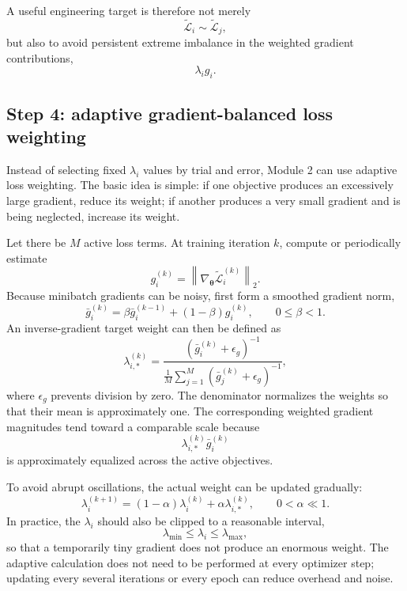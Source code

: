 \documentclass[11pt]{article}
\newcommand{\thetav}{\bm{\theta}}
\begin{document}
A useful engineering target is therefore not merely
\begin{equation}
\widetilde{\mathcal{L}}_i\sim \widetilde{\mathcal{L}}_j,
\end{equation}
but also to avoid persistent extreme imbalance in the weighted gradient contributions,
\begin{equation}
\lambda_i g_i.
\end{equation}

\subsection{Step 4: adaptive gradient-balanced loss weighting}

Instead of selecting fixed $\lambda_i$ values by trial and error, Module 2 can use adaptive loss weighting. The basic idea is simple: if one objective produces an excessively large gradient, reduce its weight; if another produces a very small gradient and is being neglected, increase its weight.

Let there be $M$ active loss terms. At training iteration $k$, compute or periodically estimate
\begin{equation}
g_i^{(k)}
=\left\|\nabla_{\thetav}\widetilde{\mathcal{L}}_i^{(k)}\right\|_2.
\end{equation}
Because minibatch gradients can be noisy, first form a smoothed gradient norm,
\begin{equation}
\bar{g}_i^{(k)}
=\beta\bar{g}_i^{(k-1)}
+(1-\beta)g_i^{(k)},
\qquad 0\leq\beta<1.
\label{eq:gradient_ema}
\end{equation}
An inverse-gradient target weight can then be defined as
\begin{equation}
\lambda_{i,*}^{(k)}
=
\frac{\left(\bar{g}_i^{(k)}+\epsilon_g\right)^{-1}}
{\displaystyle \frac{1}{M}\sum_{j=1}^{M}
\left(\bar{g}_j^{(k)}+\epsilon_g\right)^{-1}},
\label{eq:adaptive_target_weight}
\end{equation}
where $\epsilon_g$ prevents division by zero. The denominator normalizes the weights so that their mean is approximately one. The corresponding weighted gradient magnitudes tend toward a comparable scale because
\begin{equation}
\lambda_{i,*}^{(k)}\bar{g}_i^{(k)}
\end{equation}
is approximately equalized across the active objectives.

To avoid abrupt oscillations, the actual weight can be updated gradually:
\begin{equation}
\lambda_i^{(k+1)}
=(1-\alpha)\lambda_i^{(k)}
+\alpha\lambda_{i,*}^{(k)},
\qquad 0<\alpha\ll 1.
\label{eq:adaptive_weight_smoothing}
\end{equation}
In practice, the $\lambda_i$ should also be clipped to a reasonable interval,
\begin{equation}
\lambda_{\min}\leq\lambda_i\leq\lambda_{\max},
\end{equation}
so that a temporarily tiny gradient does not produce an enormous weight. The adaptive calculation does not need to be performed at every optimizer step; updating every several iterations or every epoch can reduce overhead and noise.
\end{document}
